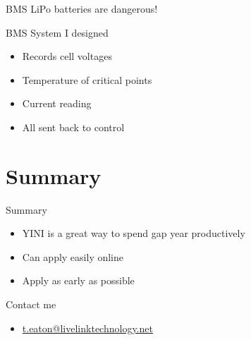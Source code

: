 \documentclass{beamer}
\begin{document}
\begin{frame}{BMS}
	LiPo batteries are dangerous!
	\centering
\end{frame}

\begin{frame}{BMS}
	System I designed
	\begin{itemize}
		\item
			Records cell voltages
		\item
			Temperature of critical points
		\item 
			Current reading
		\item 
			All sent back to control
	\end{itemize}
\end{frame}

\section*{Summary}

\begin{frame}{Summary}

  \begin{itemize}
  \item
	  \alert{YINI} is a great way to spend gap year productively
  \item
	  Can apply easily online
  \item
	  Apply as early as possible
  \end{itemize}
\end{frame}

\begin{frame}{Contact me}
    \begin{itemize}
        \item \url{t.eaton@livelinktechnology.net}
    \end{itemize}
\end{frame} 
\end{document}
